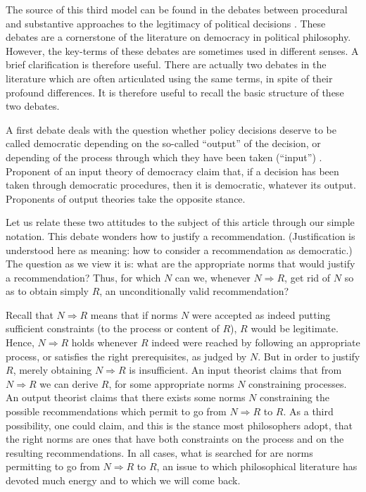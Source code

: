 \documentclass[preprint, french, english, 11pt, authoryear]{elsarticle}%
\begin{document}
The source of this third model can be found in the debates between procedural and substantive approaches to the legitimacy of political decisions \cite{meinard_what_2017}. These debates are a cornerstone of the literature on democracy in political philosophy. However, the key-terms of these debates are sometimes used in different senses. A brief clarification is therefore useful. There are actually two debates in the literature which are often articulated using the same terms, in spite of their profound differences. It is therefore useful to recall the basic structure of these two debates.

A first debate deals with the question whether policy decisions deserve to be called democratic depending on the so-called “output” of the decision, or depending of the process through which they have been taken (“input”) \cite{vatn_environmental_2016, backstrand_environmental_2010}. Proponent of an input theory of democracy claim that, if a decision has been taken through democratic procedures, then it is democratic, whatever its output. Proponents of output theories take the opposite stance. 

Let us relate these two attitudes to the subject of this article through our simple notation. This debate wonders how to justify a recommendation. (Justification is understood here as meaning: how to consider a recommendation as democratic.) The question as we view it is: what are the appropriate norms that would justify a recommendation? Thus, for which $N$ can we, whenever $N ⇒ R$, get rid of $N$ so as to obtain simply $R$, an unconditionally valid recommendation? 

Recall that $N ⇒ R$ means that if norms $N$ were accepted as indeed putting sufficient constraints (to the process or content of $R$), $R$ would be legitimate. Hence, $N ⇒ R$ holds whenever $R$ indeed were reached by following an appropriate process, or satisfies the right prerequisites, as judged by $N$.
But in order to justify $R$, merely obtaining $N ⇒ R$ is insufficient. An input theorist claims that from $N ⇒ R$ we can derive $R$, for some appropriate norms $N$ constraining processes. An output theorist claims that there exists some norms $N$ constraining the possible recommendations which permit to go from $N ⇒ R$ to $R$. As a third possibility, one could claim, and this is the stance most philosophers adopt, that the right norms are ones that have both constraints on the process and on the resulting recommendations. In all cases, what is searched for are norms permitting to go from $N ⇒ R$ to $R$, an issue to which philosophical literature has devoted much energy and to which we will come back.
\end{document}
